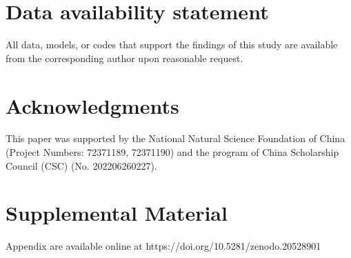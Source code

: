 \documentclass[authoryear,preprint,review,times,10pt]{elsarticle}
\begin{document}
\section*{Data availability statement}
All data, models, or codes that support the findings of this study are available from the corresponding author upon reasonable request.

\section*{Acknowledgments}
This paper was supported by the National Natural Science Foundation of China (Project Numbers: 72371189, 72371190) and the program of China Scholarship Council (CSC) (No. 202206260227).

\section*{Supplemental Material}
Appendix are available online at https://doi.org/10.5281/zenodo.20528901



\end{document}
